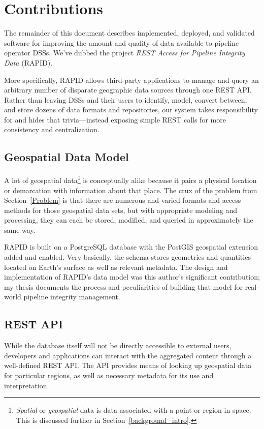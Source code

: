 \section{Contributions}
The remainder of this document describes implemented, deployed, and validated software for improving the amount and quality of data available to pipeline operator DSSs. We've dubbed the project \textit{REST Access for Pipeline Integrity Data} (RAPID).

More specifically, RAPID allows third-party applications to manage and query an arbitrary number of disparate geographic data sources through one REST API. Rather than leaving DSSs and their users to identify, model, convert between, and store dozens of data formats and repositories, our system takes responsibility for and hides that trivia---instead exposing simple REST calls for more consistency and centralization.

\subsection{Geospatial Data Model}
A lot of geospatial data\footnote{\textit{Spatial} or \textit{geospatial} data is data associated with a point or region in space. This is discussed further in Section~\ref{background_intro}.} is conceptually alike because it pairs a physical location or demarcation with information about that place. The crux of the problem from Section~\ref{Problem} is that there are numerous and varied formats and access methods for those geospatial data sets, but with appropriate modeling and processing, they can each be stored, modified, and queried in approximately the same way.

RAPID is built on a PostgreSQL database with the PostGIS geospatial extension added and enabled. Very basically, the schema stores geometries and quantities located on Earth's surface as well as relevant metadata. The design and implementation of RAPID's data model was this author's significant contribution; my thesis documents the process and peculiarities of building that model for real-world pipeline integrity management.

\subsection{REST API}
While the database itself will not be directly accessible to external users, developers and applications can interact with the aggregated content through a well-defined REST API. The API provides means of looking up geospatial data for particular regions, as well as necessary metadata for its use and interpretation.


